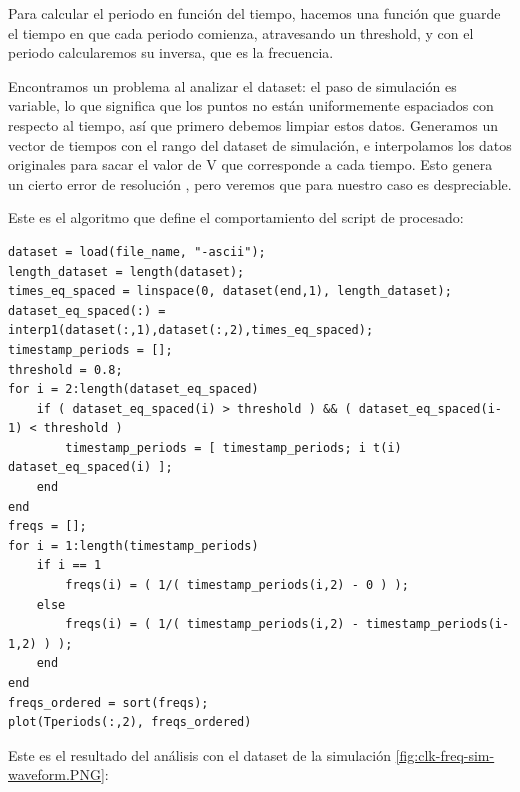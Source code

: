 \documentclass[12pt]{report} %
\begin{document}
	Para calcular el periodo en función del tiempo, hacemos una función que guarde el tiempo en que cada periodo comienza, atravesando un threshold, y con el periodo calcularemos su inversa, que es la frecuencia.
	
	Encontramos un problema al analizar el dataset: el paso de simulación es variable, lo que significa que los puntos no están uniformemente espaciados con respecto al tiempo, así que primero debemos limpiar estos datos. Generamos un vector de tiempos con el rango del dataset de simulación, e interpolamos los datos originales para sacar el valor de V que corresponde a cada tiempo. Esto genera un cierto error de resolución %
	, pero veremos que para nuestro caso es despreciable.
	
	Este es el algoritmo que define el comportamiento del script de procesado:
	
	\begin{lstlisting}[caption={Código en Matlab/Octave para procesar la forma de onda del reloj de frecuencia variable},label={lst:code-clk-var}]
dataset = load(file_name, "-ascii");
length_dataset = length(dataset);
times_eq_spaced = linspace(0, dataset(end,1), length_dataset);
dataset_eq_spaced(:) = interp1(dataset(:,1),dataset(:,2),times_eq_spaced);
timestamp_periods = [];
threshold = 0.8;
for i = 2:length(dataset_eq_spaced)
	if ( dataset_eq_spaced(i) > threshold ) && ( dataset_eq_spaced(i-1) < threshold )
		timestamp_periods = [ timestamp_periods; i t(i) dataset_eq_spaced(i) ];
	end
end
freqs = [];
for i = 1:length(timestamp_periods)
	if i == 1
		freqs(i) = ( 1/( timestamp_periods(i,2) - 0 ) );
	else
		freqs(i) = ( 1/( timestamp_periods(i,2) - timestamp_periods(i-1,2) ) );
	end
end
freqs_ordered = sort(freqs);
plot(Tperiods(:,2), freqs_ordered)
	\end{lstlisting} 

	Este es el resultado del análisis con el dataset de la simulación \ref{fig:clk-freq-sim-waveform.PNG}:
	
\end{document}
